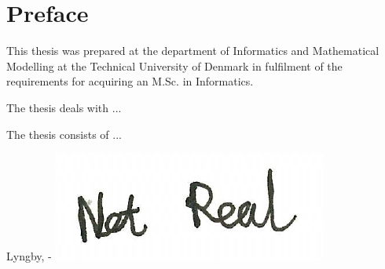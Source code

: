 \chapter{Preface}

This thesis was prepared at the department of Informatics and Mathematical Modelling at the Technical University of Denmark in fulfilment of the
requirements for acquiring an M.Sc. in Informatics.

The thesis deals with ...

The thesis consists of ...
\vspace{20mm}
\begin{center}
    \hspace{20mm} Lyngby, \thesishandin-\thesisyear
    \vspace{5mm}
    \newline
    \includegraphics[scale=0.5]{figures/SignatureDummy}
\end{center}
\begin{flushright}
    \thesisauthor
\end{flushright}
